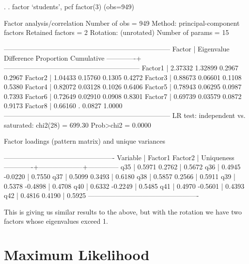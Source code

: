 \documentclass[12pt]{article}
\begin{document}
\begin{stlog}
  
. 
. factor `students', pcf factor(3)
(obs=949)

Factor analysis/correlation                        Number of obs    =      949
    Method: principal-component factors            Retained factors =        2
    Rotation: (unrotated)                          Number of params =       15

    --------------------------------------------------------------------------
         Factor  |   Eigenvalue   Difference        Proportion   Cumulative
    -------------+------------------------------------------------------------
        Factor1  |      2.37332      1.32899            0.2967       0.2967
        Factor2  |      1.04433      0.15760            0.1305       0.4272
        Factor3  |      0.88673      0.06601            0.1108       0.5380
        Factor4  |      0.82072      0.03128            0.1026       0.6406
        Factor5  |      0.78943      0.06295            0.0987       0.7393
        Factor6  |      0.72649      0.02910            0.0908       0.8301
        Factor7  |      0.69739      0.03579            0.0872       0.9173
        Factor8  |      0.66160            .            0.0827       1.0000
    --------------------------------------------------------------------------
    LR test: independent vs. saturated:  chi2(28) =  699.30 Prob>chi2 = 0.0000

Factor loadings (pattern matrix) and unique variances

    -------------------------------------------------
        Variable |  Factor1   Factor2 |   Uniqueness 
    -------------+--------------------+--------------
             q35 |   0.5971    0.2762 |      0.5672  
             q36 |   0.4945   -0.0220 |      0.7550  
             q37 |   0.5099    0.3493 |      0.6180  
             q38 |   0.5857    0.2566 |      0.5911  
             q39 |   0.5378   -0.4898 |      0.4708  
             q40 |   0.6332   -0.2249 |      0.5485  
             q41 |   0.4970   -0.5601 |      0.4393  
             q42 |   0.4816    0.4190 |      0.5925  
    -------------------------------------------------

\end{stlog}

This is giving us similar results to the above, but with the rotation
we have two factors whose eigenvalues exceed 1. 

\section{Maximum Likelihood}
\end{document}

